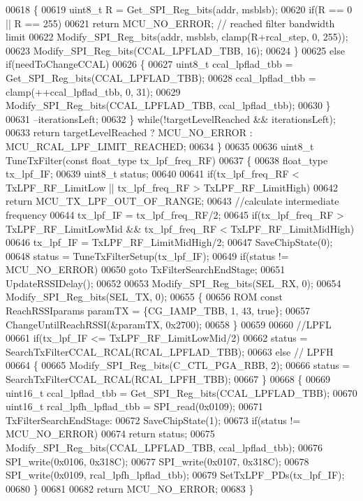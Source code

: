 \begin{DoxyCode}
00618         \{
00619             uint8\_t R = Get_SPI_Reg_bits(addr, msblsb);
00620             \textcolor{keywordflow}{if}(R == 0 || R == 255)
00621                 \textcolor{keywordflow}{return} MCU_NO_ERROR; \textcolor{comment}{// reached filter bandwidth limit}
00622             Modify_SPI_Reg_bits(addr, msblsb, clamp(R+rcal\_step, 0, 255));
00623             Modify_SPI_Reg_bits(CCAL_LPFLAD_TBB, 16);
00624         \}
00625         \textcolor{keywordflow}{else} \textcolor{keywordflow}{if}(needToChangeCCAL)
00626         \{
00627             uint8\_t ccal\_lpflad\_tbb = Get_SPI_Reg_bits(CCAL_LPFLAD_TBB);
00628             ccal\_lpflad\_tbb = clamp(++ccal\_lpflad\_tbb, 0, 31);
00629             Modify_SPI_Reg_bits(CCAL_LPFLAD_TBB, ccal\_lpflad\_tbb);
00630         \}
00631         --iterationsLeft;
00632     \} \textcolor{keywordflow}{while}(!targetLevelReached && iterationsLeft);
00633     \textcolor{keywordflow}{return} targetLevelReached ? MCU_NO_ERROR : MCU_RCAL_LPF_LIMIT_REACHED;
00634 \}
00635 
00636 uint8\_t TuneTxFilter(\textcolor{keyword}{const} float_type tx\_lpf\_freq\_RF)
00637 \{
00638     float_type tx\_lpf\_IF;
00639     uint8\_t status;
00640 
00641     \textcolor{keywordflow}{if}(tx\_lpf\_freq\_RF < TxLPF\_RF\_LimitLow || tx\_lpf\_freq\_RF > TxLPF_RF_LimitHigh)
00642         \textcolor{keywordflow}{return} MCU_TX_LPF_OUT_OF_RANGE;
00643     \textcolor{comment}{//calculate intermediate frequency}
00644     tx\_lpf\_IF = tx\_lpf\_freq\_RF/2;
00645     \textcolor{keywordflow}{if}(tx\_lpf\_freq\_RF > TxLPF_RF_LimitLowMid && tx\_lpf\_freq\_RF < 
      TxLPF_RF_LimitMidHigh)
00646         tx\_lpf\_IF = TxLPF_RF_LimitMidHigh/2;
00647     SaveChipState(0);
00648     status = TuneTxFilterSetup(tx\_lpf\_IF);
00649     \textcolor{keywordflow}{if}(status != MCU_NO_ERROR)
00650         \textcolor{keywordflow}{goto} TxFilterSearchEndStage;
00651     UpdateRSSIDelay();
00652 
00653     Modify_SPI_Reg_bits(SEL_RX, 0);
00654     Modify_SPI_Reg_bits(SEL_TX, 0);
00655     \{
00656         ROM \textcolor{keyword}{const} ReachRSSIparams paramTX = \{CG_IAMP_TBB, 1, 43, \textcolor{keyword}{true}\};
00657         ChangeUntilReachRSSI(&paramTX, 0x2700);
00658     \}
00659 
00660     \textcolor{comment}{//LPFL}
00661     \textcolor{keywordflow}{if}(tx\_lpf\_IF <= TxLPF_RF_LimitLowMid/2)
00662         status = SearchTxFilterCCAL_RCAL(RCAL_LPFLAD_TBB);
00663     \textcolor{keywordflow}{else} \textcolor{comment}{// LPFH}
00664     \{
00665         Modify_SPI_Reg_bits(C_CTL_PGA_RBB, 2);
00666         status = SearchTxFilterCCAL_RCAL(RCAL_LPFH_TBB);
00667     \}
00668     \{
00669         uint16\_t ccal\_lpflad\_tbb = Get_SPI_Reg_bits(CCAL_LPFLAD_TBB);
00670         uint16\_t rcal\_lpfh\_lpflad\_tbb = SPI_read(0x0109);
00671     TxFilterSearchEndStage:
00672         SaveChipState(1);
00673         \textcolor{keywordflow}{if}(status != MCU_NO_ERROR)
00674             \textcolor{keywordflow}{return} status;
00675         Modify_SPI_Reg_bits(CCAL_LPFLAD_TBB, ccal\_lpflad\_tbb);
00676         SPI_write(0x0106, 0x318C);
00677         SPI_write(0x0107, 0x318C);
00678         SPI_write(0x0109, rcal\_lpfh\_lpflad\_tbb);
00679         SetTxLPF_PDs(tx\_lpf\_IF);
00680     \}
00681 
00682     \textcolor{keywordflow}{return} MCU_NO_ERROR;
00683 \}
\end{DoxyCode}
